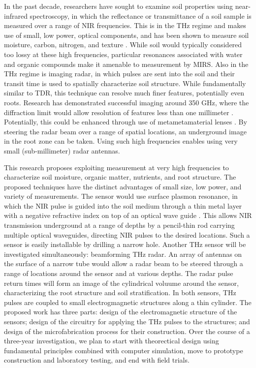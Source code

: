 \documentclass[11pt,letterpaper]{article}
\begin{document}
In the past decade, researchers have sought to examine soil properties using near-infrared spectroscopy, in which the reflectance or transmittance of a soil sample is measured over a range of NIR frequencies. This is in the THz regime and makes use of small, low power, optical components, and has been shown to measure soil moisture, carbon, nitrogen, and texture \cite{chang2001near}. While soil would typically considered too lossy at these high frequencies, particular resonances associated with water and organic compounds make it amenable to measurement by MIRS. Also in the THz regime is imaging radar, in which pulses are sent into the soil and their transit time is used to spatially characterize soil structure. While fundamentally similar to TDR, this technique can resolve much finer features, potentially even roots. Research has demonstrated successful imaging around 350 GHz, where the diffraction limit would allow resolution of features less than one millimeter \cite{dworak2011application}. Potentially, this could be enhanced through use of metametamaterial lenses \cite{wood2007structure}. By steering the radar beam over a range of spatial locations, an underground image in the root zone can be taken. Using such high frequencies enables using very small (sub-millimeter) radar antennas.

This research proposes exploiting measurement at very high frequencies to characterize soil moisture, organic matter, nutrients, and root structure. The proposed techniques have the distinct advantages of small size, low power, and variety of measurements. The sensor would use surface plasmon resonance, in which the NIR pulse is guided into the soil medium through a thin metal layer with a negative refractive index on top of an optical wave guide \cite{shibayama2016surface}. This allows NIR transmission underground at a range of depths by a pencil-thin rod carrying multiple optical waveguides, directing NIR pulses to the desired locations. Such a sensor is easily installable by drilling a narrow hole. Another THz sensor will be investigated simultaneously: beamforming THz radar. An array of antennas on the surface of a narrow tube would allow a radar beam to be steered through a range of locations around the sensor and at various depths. The radar pulse return times will form an image of the cylindrical voluume around the sensor, characterizing the root structure and soil stratification. In both sensors, THz pulses are coupled to small electrogmagnetic structures along a thin cylinder. The proposed work has three parts: design of the electromagnetic structure of the sensors; design of the circuitry for applying the THz pulses to the structures; and design of the microfabrication process for their construction. Over the course of a three-year investigation, we plan to start with theorectical design using fundamental principles combined with computer simulation, move to prototype construction and laboratory testing, and end with field trials.
\end{document}

